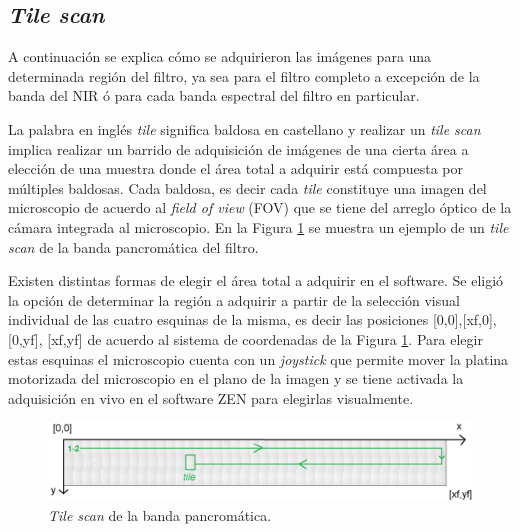 
\singlespacing
\subsection{\textit{Tile scan}}
\label{subs:tilsc}

\hspace{0.5cm}A continuación se explica cómo se adquirieron las imágenes para una determinada región del filtro, ya sea para el filtro completo a excepción de la banda del NIR ó para cada banda espectral del filtro en particular.

La palabra en inglés \textit{tile} significa baldosa en castellano y realizar un \textit{tile scan} implica realizar un barrido de adquisición de imágenes de una cierta área a elección de una muestra donde el área total a adquirir está compuesta por múltiples baldosas. Cada baldosa, es decir cada \textit{tile} constituye una imagen del microscopio de acuerdo al \textit{field of view} (FOV) que se tiene del arreglo óptico de la cámara integrada al microscopio. En la Figura \ref{fig:tilescan} se muestra un ejemplo de un \textit{tile scan} de la banda pancromática del filtro.

Existen distintas formas de elegir el área total a adquirir en el software. Se eligió la opción de determinar la región a adquirir a partir de la selección visual individual de las cuatro esquinas de la misma, es decir las posiciones [0,0],[xf,0],[0,yf], [xf,yf] de acuerdo al sistema de coordenadas de la Figura \ref{fig:tilescan}. Para elegir estas esquinas el microscopio cuenta con un \textit{joystick} que permite mover la platina motorizada del microscopio en el plano de la imagen y se tiene activada la adquisición en vivo en el software ZEN para elegirlas visualmente.


\begin{figure}[H]
	\centering
	\includegraphics[width=1.0\textwidth]{Figs/cuantificaciondefectos/tilescan.png}
	\caption{\textit{Tile scan} de la banda pancromática.}
	\label{fig:tilescan}
\end{figure} 

